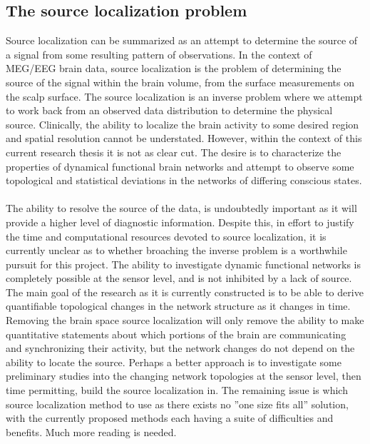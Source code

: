\documentclass{article}
\begin{document}
\subsection{The source localization problem}
Source localization can be summarized as an attempt to determine the source of a signal from some resulting pattern of observations. In the context of MEG/EEG brain data, source localization is the problem of determining the source of the signal within the brain volume, from the surface measurements on the scalp surface. The source localization is an inverse problem where we attempt to work back from an observed data distribution to determine the physical source. Clinically, the ability to localize the brain activity to some desired region and spatial resolution cannot be understated. However, within the context of this current research thesis it is not as clear cut. The desire is to characterize the properties of dynamical functional brain networks and attempt to observe some topological and statistical deviations in the networks of differing conscious states.\\ 
\\
The ability to resolve the source of the data, is undoubtedly important as it will provide a higher level of diagnostic information. Despite this, in effort to justify the time and computational resources devoted to source localization, it is currently unclear as to whether broaching the inverse problem is a worthwhile pursuit for this project. The ability to investigate dynamic functional networks is completely possible at the sensor level, and is not inhibited by a lack of source. The main goal of the research as it is currently constructed is to be able to derive quantifiable topological changes in the network structure as it changes in time. Removing the brain space source localization will only remove the ability to make quantitative statements about which portions of the brain are communicating and synchronizing their activity, but the network changes do not depend on the ability to locate the source. Perhaps a better approach is to investigate some preliminary studies into the changing network topologies at the sensor level, then time permitting, build the source localization in. The remaining issue is which source localization method to use as there exists no ''one size fits all'' solution, with the currently proposed methods each having a suite of difficulties and benefits. Much more reading is needed. 
\end{document}
